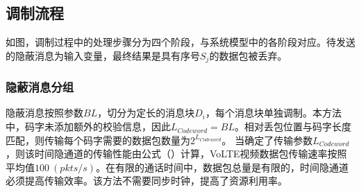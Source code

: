 \subsection{调制流程}
\label{chap:zigzag:model:modulation}


如图，调制过程中的处理步骤分为四个阶段，与系统模型中的各阶段对应。待发送的隐蔽消息为输入变量，最终结果是具有序号$S_{j}$的数据包被丢弃。

\subsubsection{隐蔽消息分组}
\label{chap:zigzag:model:modulation:segment}
隐蔽消息按照参数$BL$，切分为定长的消息块$D_{i}$，每个消息块单独调制。本方法中，码字未添加额外的校验信息，因此$L_{Codeword}=BL$。相对丢包位置与码字长度匹配，则传输每个码字需要的数据包数量为$2^{L_{Codeword}}$。
当确定了传输参数$L_{Codeword}$，则该时间隐通道的传输性能由公式（）计算，VoLTE视频数据包传输速率按照平均值$100\ (pkts/s)$。在有限的通话时间中，数据包总量是有限的，时间隐通道必须提高传输效率。该方法不需要同步时钟，提高了资源利用率。

